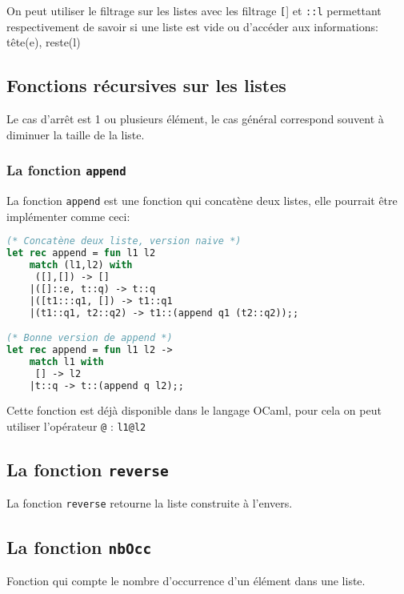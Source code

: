 	On peut utiliser le filtrage sur les listes avec les filtrage \texttt[] et \texttt{::l} permettant respectivement de savoir si une liste est vide ou
	d'accéder aux informations: tête(e), reste(l)

	\subsection{Fonctions récursives sur les listes}
	Le cas d'arrêt est 1 ou plusieurs élément, le cas général correspond souvent à diminuer la taille de la liste.



\subsubsection{La fonction \texttt{append}}
La fonction \texttt{append} est une fonction qui concatène deux listes, elle pourrait être implémenter comme ceci: 
\begin{lstlisting}[language=Caml, caption=Exemple d'implémentation de \texttt{append}]
(* Concatène deux liste, version naive *)
let rec append = fun l1 l2 
    match (l1,l2) with
     ([],[]) -> [] 
    |([]::e, t::q) -> t::q
    |([t1:::q1, []) -> t1::q1
    |(t1::q1, t2::q2) -> t1::(append q1 (t2::q2));;

(* Bonne version de append *)
let rec append = fun l1 l2 ->
    match l1 with
     [] -> l2
    |t::q -> t::(append q l2);;
\end{lstlisting}

\begin{remarque}
Cette fonction est déjà disponible dans le langage OCaml, pour cela on peut utiliser l'opérateur \texttt{@} : \texttt{l1@l2}
\end{remarque}

\subsection{La fonction \texttt{reverse}}
La fonction \texttt{reverse} retourne la liste construite à l'envers.


\subsection{La fonction \texttt{nbOcc}}
Fonction qui compte le nombre d'occurrence d'un élément dans une liste.

